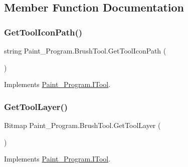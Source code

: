 \subsection{Member Function Documentation}
\mbox{\label{class_paint___program_1_1_brush_tool_a7cc103269b01a6367edce7c994443739}} 
\subsubsection{\texorpdfstring{Get\+Tool\+Icon\+Path()}{GetToolIconPath()}}
{\footnotesize\ttfamily string Paint\+\_\+\+Program.\+Brush\+Tool.\+Get\+Tool\+Icon\+Path (\begin{DoxyParamCaption}{ }\end{DoxyParamCaption})\hspace{0.3cm}{\ttfamily [inline]}}



Implements \mbox{\hyperlink{interface_paint___program_1_1_i_tool_aa057d2f99c59d7bec0215dcad2da1b72}{Paint\+\_\+\+Program.\+I\+Tool}}.

\mbox{\label{class_paint___program_1_1_brush_tool_ae96d4b9560f8d271694abd1e727dd14c}} 
\subsubsection{\texorpdfstring{Get\+Tool\+Layer()}{GetToolLayer()}}
{\footnotesize\ttfamily Bitmap Paint\+\_\+\+Program.\+Brush\+Tool.\+Get\+Tool\+Layer (\begin{DoxyParamCaption}{ }\end{DoxyParamCaption})\hspace{0.3cm}{\ttfamily [inline]}}



Implements \mbox{\hyperlink{interface_paint___program_1_1_i_tool_a9b057905515f42a988c166a6a40318e0}{Paint\+\_\+\+Program.\+I\+Tool}}.

